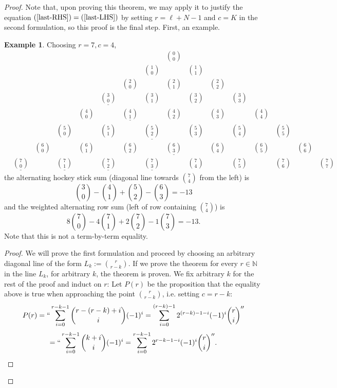 \documentclass[11pt]{article}
\theoremstyle{plain}
\theoremstyle{definition}
\newtheorem{example}[fact]{Example}
\theoremstyle{definition}
\newcounter{equation}
\newcommand{\bb}[1]{\mathbb{#1}}
\begin{document}
\begin{proof}
Note that, upon proving this theorem, we may apply it to justify the equation $(\ref{last-RHS})=(\ref{last-LHS})$ by setting $r=\ell+N-1$ and $c=K$ in the second formulation, so this proof is the final step. First, an example.
\begin{example} Choosing $r=7,c=4$, 
$$
\begin{array}{ccccccccccccccccc}
& & & & & & & & \binom{0}{0} & & & & & & & \\ 
& & & & & & & \binom{1}{0} & & \binom{1}{1} & & & & & & \\ 
& & & & & & \binom{2}{0} & & \binom{2}{1} & & \binom{2}{2} & & & & & \\ 
& & & & & \underline{\binom{3}{0}} & & \binom{3}{1} & & \binom{3}{2} & & \binom{3}{3} & & & & \\ 
& & & & \binom{4}{0} & & \underline{\binom{4}{1}} & & \binom{4}{2} & & \binom{4}{3} & & \binom{4}{4} & & & \\ 
 && & \binom{5}{0} & & \binom{5}{1} & & \underline{\binom{5}{2}} & & \binom{5}{3} & & \binom{5}{4} & & \binom{5}{5} & \\ 
 && \binom{6}{0} & & \binom{6}{1} & & \binom{6}{2} & & \underline{\binom{6}{3}} & & \binom{6}{4} & & \binom{6}{5} & & \binom{6}{6} \\ 
&\underline{\binom{7}{0}} & & \underline{\binom{7}{1}} & & \underline{\binom{7}{2}} & & \underline{\binom{7}{3}} & & \boxed{\binom{7}{4}} & & \binom{7}{5} & & \binom{7}{6} & & \binom{7}{7} 
\end{array}
$$
the alternating hockey stick sum (diagonal line towards ${7\choose 4}$ from the left) is 
$$
{3\choose 0}-{4\choose 1}+{5\choose 2}-{6\choose 3} = -13
$$
and the weighted alternating row sum (left of row containing ${7\choose 4}$) is 
$$
8{7\choose 0}-4{7\choose 1}+2{7\choose 2}-1{7\choose 3} = -13.
$$
Note that this is not a term-by-term equality. 
\end{example}
\begin{proof}
We will prove the first formulation and proceed by choosing an arbitrary diagonal line of the form $L_k:={r\choose r-k}$. If we prove the theorem for every $r\in \bb N$ in the line $L_k$, for arbitrary $k$, the theorem is proven. We fix arbitrary $k$ for the rest of the proof and induct on $r$: Let $P(r)$ be the proposition that the equality above is true when approaching the point ${r\choose r-k}$, i.e. setting $c=r-k$:
$$
P(r) = ``\sum_{i=0}^{r-k-1}{r-(r-k)+i\choose i}(-1)^i = \sum_{i=0}^{(r-k)-1}2^{(r-k)-1-i}(-1)^i{r\choose i}''
$$
$$
=``\sum_{i=0}^{r-k-1}{k+i\choose i}(-1)^i = \sum_{i=0}^{r-k-1}2^{r-k-1-i}(-1)^i{r\choose i}''.
$$
\end{proof}
\end{proof}
\end{document}
